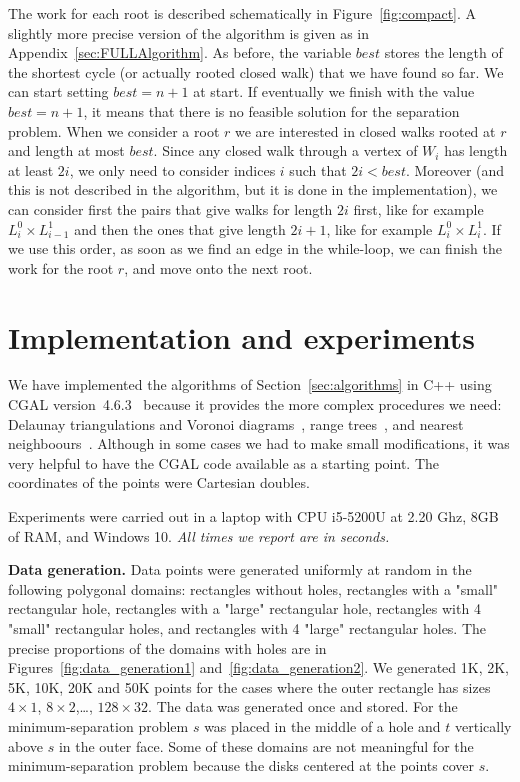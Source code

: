 \documentclass[a4paper,USenglish]{lipics}
\def\best{\mathit{best}}
\def\myparagraph#1{\medskip\noindent\textbf{#1.}}
\begin{document}
The work for each root is described schematically in Figure~\ref{fig:compact}.
A slightly more precise version of the algorithm is given 
as  in Appendix~\ref{sec:FULLAlgorithm}.
As before, the variable $\best$ stores the length of the shortest cycle (or actually
rooted closed walk) that we have found so far. We can start setting $\best=n+1$
at start.
If eventually we finish with the value $\best=n+1$, it means that there is no
feasible solution for the separation problem.
When we consider a root $r$ we are interested in closed walks rooted at $r$
and length at most $\best$. Since any closed walk through a vertex of $W_i$ has
length at least $2i$, we only need to consider indices $i$ such that $2i<\best$.
Moreover (and this is not described in the algorithm, but it is done
in the implementation), we can consider first
the pairs that give walks for length $2i$ first, like for example $L^0_i\times L^1_{i-1}$ 
and then the ones that give length  $2i+1$, like for example $L^0_i\times L^1_i$.
If we use this order, as soon as we find an edge in 
the while-loop, we can finish the work for the root $r$, and move onto the next root.


\section{Implementation and experiments}
\label{sec:implementation}

We have implemented the algorithms of Section~\ref{sec:algorithms}
in C++ using CGAL version~4.6.3~\cite{cgal}
because it provides the more complex procedures we need:
Delaunay triangulations and Voronoi diagrams~\cite{cgal:k-vda2-15a}, 
range trees~\cite{cgal:n-rstd-15a}, and nearest neighboours~\cite{cgal:tf-ssd-15a}.
Although in some cases we had to make small modifications, it was
very helpful to have the CGAL code available as a starting point. 
The coordinates of the points were Cartesian doubles.

Experiments were carried out in a laptop with CPU i5-5200U at 2.20 Ghz, 
8GB of RAM, and Windows 10. \emph{All times we report are in seconds.}

\myparagraph{Data generation}
Data points were generated uniformly at random in the following polygonal domains:
rectangles without holes, rectangles with a "small" rectangular hole, rectangles
with a "large" rectangular hole, rectangles with 4 "small" rectangular holes, 
and rectangles with 4 "large" rectangular holes. The precise proportions of the domains
with holes are in Figures~\ref{fig:data_generation1} and~\ref{fig:data_generation2}.
We generated 1K, 2K, 5K, 10K, 20K and 50K points for the cases where the outer rectangle
has sizes $4\times 1$, $8\times 2$,\ldots, $128\times 32$.
The data was generated once and stored.
For the minimum-separation problem $s$ was placed in the middle of a hole and 
$t$ vertically above $s$ in the outer face.  
Some of these domains are not meaningful for the minimum-separation problem 
because the disks centered at the points cover $s$. 
\end{document}
